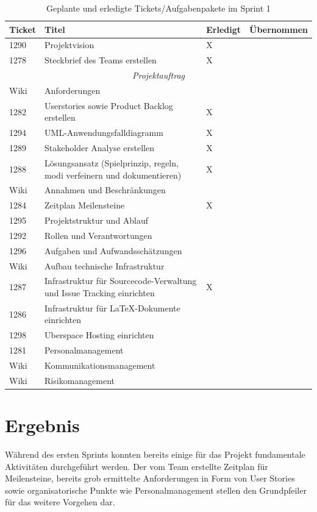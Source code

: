 \documentclass[a4paper,11pt,listof=numbered,glossary=totoc,parskip=half,toc=bib]{scrreprt}
\begin{document}
\begin{table}
    \begin{tabularx}{\textwidth}{lXll}
			\toprule
			\textbf{Ticket} & \textbf{Titel} & \textbf{Erledigt} & \textbf{Übernommen} \\
			\midrule
		1290	&	Projektvision	&	X	&		\\
		1278	&	Steckbrief des Teams erstellen	&	X	&		\\
		\midrule
		\multicolumn{4}{c}{\textit{Projektauftrag}}\\
		\midrule
		Wiki	&	Anforderungen 	&		&		\\
		1282	&	Userstories sowie Product Backlog erstellen	&	X	&		\\
		1294	&	UML-Anwendungsfalldiagramm	&	X	&		\\
		1289	&	Stakeholder Analyse erstellen	&	X	&		\\
		1288	&	Lösungsansatz (Spielprinzip, regeln, modi verfeinern und dokumentieren)	&	X	&		\\
		Wiki	&	Annahmen und Beschränkungen	&		&		\\
		1284	&	Zeitplan Meilensteine	&	X	&		\\
		1295	&	Projektstruktur und Ablauf	&		&		\\
		1292	&	Rollen und Verantwortungen	&		&		\\
		1296	&	Aufgaben und Aufwandsschätzungen	&		&		\\
		Wiki	&	Aufbau technische Infrastruktur	&		&		\\
		1287	&	Infrastruktur für Sourcecode-Verwaltung und Issue Tracking einrichten	&	X	&		\\
		1286	&	Infrastruktur für LaTeX-Dokumente einrichten	&		&		\\
		1298	&	Uberspace Hosting einrichten	&		&		\\
		1281	&	Personalmanagement	&		&		\\
		Wiki	&	Kommunikationsmanagement	&		&		\\
		Wiki	&	Risikomanagement	&		&		\\

			\bottomrule
		\end{tabularx}
\caption{Geplante und erledigte Tickets/Aufgabenpakete im Sprint 1}
\label{tab:sprint1}
\end{table}
    
    \section{Ergebnis}
    Während des ersten Sprints konnten bereits einige für das Projekt fundamentale Aktivitäten durchgeführt werden. Der vom Team erstellte Zeitplan für Meilensteine, bereits grob ermittelte Anforderungen in Form von User Stories sowie organisatorische Punkte wie Personalmanagement stellen den Grundpfeiler für das weitere Vorgehen dar. 
    
\end{document}
